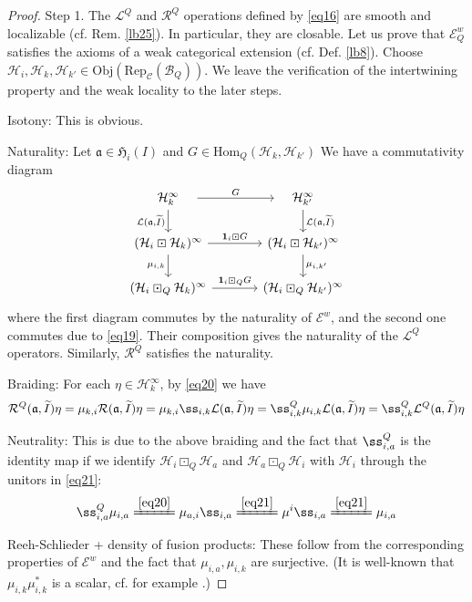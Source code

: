 \documentclass[11pt,b5paper,notitlepage]{article}
\theoremstyle{definition}
\theoremstyle{plain}
\newcommand{\fk}{\mathfrak}
\newcommand{\mc}{\mathcal}
\newcommand{\wtd}{\widetilde}
\newcommand{\idt}{\mathbf{1}}
\newcommand{\Hom}{\mathrm{Hom}}
\newcommand{\Rep}{\mathrm{Rep}}
\newcommand{\scr}{\mathscr}
\newcommand{\Obj}{\mathrm{Obj}}
\numberwithin{equation}{section}
\begin{document}
\begin{proof}
Step 1. The $\mc L^Q$ and $\mc R^Q$ operations defined by \eqref{eq16} are smooth and localizable (cf. Rem. \ref{lb25}). In particular, they are closable. Let us prove that $\scr E_Q^w$ satisfies the axioms of a weak categorical extension (cf. Def. \ref{lb8}). Choose $\mc H_i,\mc H_k,\mc H_{k'}\in \Obj(\Rep_{\scr C}(\mc B_Q))$. We leave the verification of the intertwining property and the weak locality to the later steps.

Isotony: This is obvious.

Naturality: Let $\fk a\in\fk H_i(I)$ and $G\in\Hom_Q(\mc H_k,\mc H_{k'})$ We have a commutativity diagram
\begin{equation}
\begin{tikzcd}[column sep=large]
\quad\mc H_k^\infty\quad \arrow[d,"{\mc L(\fk a,\wtd I)}"'] \arrow[r,"G"] & \quad\mc H_{k'}^\infty\quad \arrow[d,"{\mc L(\fk a,\wtd I)}"]  \\
(\mc H_i\boxdot\mc H_k)^\infty \arrow[r,"\idt_i\boxdot G"]  \arrow[d,"\mu_{i,k}"']         & (\mc H_i\boxdot\mc H_{k'})^\infty  \arrow[d,"{\mu_{i,{k'}}}"]        \\
(\mc H_i\boxdot_Q\mc H_k)^\infty \arrow[r,"\idt_i\boxdot_Q G"]&(\mc H_i\boxdot_Q\mc H_{k'})^\infty
\end{tikzcd}
\end{equation}
where the first diagram commutes by the naturality of $\scr E^w$, and the second one commutes due to \eqref{eq19}. Their composition gives the naturality of the $\mc L^Q$ operators. Similarly, $\mc R^Q$ satisfies the naturality.

Braiding: For each $\eta\in\mc H_k^\infty$,  by \eqref{eq20} we have
\begin{align*}
\mc R^Q(\fk a,\wtd I)\eta=\mu_{k,i}\mc R(\fk a,\wtd I)\eta=\mu_{k,i}\ss_{i,k}\mc L(\fk a,\wtd I)\eta=\ss_{i,k}^Q\mu_{i,k}\mc L(\fk a,\wtd I)\eta=\ss_{i,k}^Q\mc L^Q(\fk a,\wtd I)\eta
\end{align*}

Neutrality: This is due to the above braiding and the fact that $\ss_{i,a}^Q$ is the identity map if we identify $\mc H_i\boxdot_Q\mc H_a$ and $\mc H_a\boxdot_Q\mc H_i$ with $\mc H_i$ through the unitors in \eqref{eq21}: 
\begin{align*}
\ss_{i,a}^Q\mu_{i,a}\xlongequal{\eqref{eq20}}\mu_{a,i}\ss_{i,a}\xlongequal{\eqref{eq21}}\mu^i\ss_{i,a}\xlongequal{\eqref{eq21}}\mu_{i,a}
\end{align*}

Reeh-Schlieder + density of fusion products: These follow from the corresponding properties of $\scr E^w$ and the fact that $\mu_{i,a},\mu_{i,k}$ are surjective. (It is well-known that $\mu_{i,k}\mu_{i,k}^*$ is a scalar, cf. for example \cite[Prop. 3.3]{Gui22}.)


\end{proof}
\end{document}
